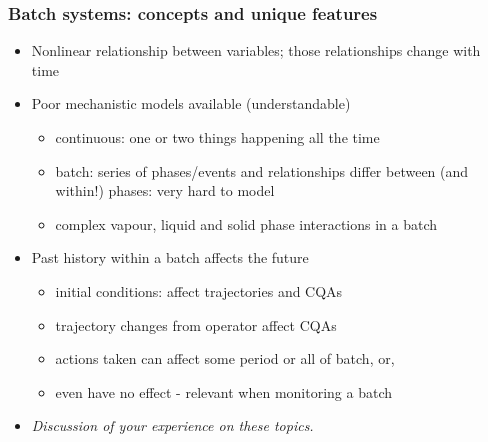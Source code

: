 \begin{frame}\frametitle{Batch systems: concepts and unique features}

\begin{itemize}
	
	\item	Nonlinear relationship between variables; those relationships change with time \pause
	
	\item	Poor mechanistic models available (understandable)
	
			\begin{itemize}
				\item	continuous: one or two things happening all the time
				
				\item	batch: series of phases/events and relationships differ between (and within!) phases: very hard to model
				
				\item	complex vapour, liquid and solid phase interactions in a batch
			\end{itemize} \pause
			
	\item 	Past history within a batch affects the future
	
			\begin{itemize}
				\item	initial conditions: affect trajectories and CQAs
				
				\item	trajectory changes from operator affect CQAs
				
				\item	actions taken can affect some period or all of batch, or,
				
				\item	even have no effect - relevant when monitoring a batch
			\end{itemize}
			
	
	\item	\emph{Discussion of your experience on these topics.}
\end{itemize}
\end{frame}

